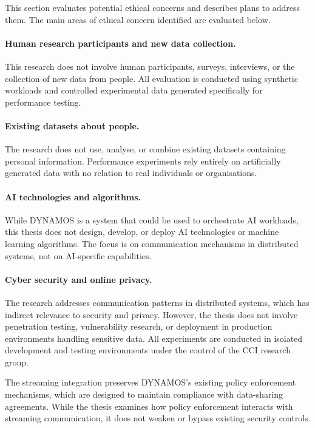 This section evaluates potential ethical concerns and describes plans to address them. The main areas of ethical concern identified are evaluated below.

\paragraph{Human research participants and new data collection.}
This research does not involve human participants, surveys, interviews, or the collection of new data from people. All evaluation is conducted using synthetic workloads and controlled experimental data generated specifically for performance testing.

\paragraph{Existing datasets about people.}
The research does not use, analyse, or combine existing datasets containing personal information. Performance experiments rely entirely on artificially generated data with no relation to real individuals or organisations.

\paragraph{AI technologies and algorithms.}
While DYNAMOS is a system that could be used to orchestrate AI workloads, this thesis does not design, develop, or deploy AI technologies or machine learning algorithms. The focus is on communication mechanisms in distributed systems, not on AI-specific capabilities.

\paragraph{Cyber security and online privacy.}
The research addresses communication patterns in distributed systems, which has indirect relevance to security and privacy. However, the thesis does not involve penetration testing, vulnerability research, or deployment in production environments handling sensitive data. All experiments are conducted in isolated development and testing environments under the control of the CCI research group.

The streaming integration preserves DYNAMOS's existing policy enforcement mechanisms, which are designed to maintain compliance with data-sharing agreements. While the thesis examines how policy enforcement interacts with streaming communication, it does not weaken or bypass existing security controls.

